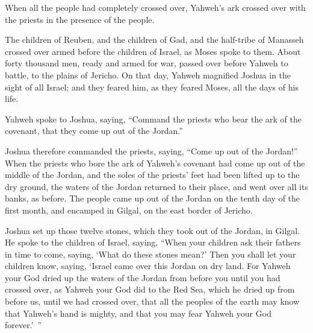 {When all the people had completely crossed over, Yahweh’s ark crossed over with the priests in the presence of the people.
\par }{\PP {}The children of Reuben, and the children of Gad, and the half-tribe of Manasseh crossed over armed before the children of Israel, as Moses spoke to them.
About forty thousand men, ready and armed for war, passed over before Yahweh to battle, to the plains of Jericho.
On that day, Yahweh magnified Joshua in the sight of all Israel; and they feared him, as they feared Moses, all the days of his life.
\par }{\PP {}Yahweh spoke to Joshua, saying,
“Command the priests who bear the ark of the covenant, that they come up out of the Jordan.”
\par }{\PP {}Joshua therefore commanded the priests, saying, “Come up out of the Jordan!”
When the priests who bore the ark of Yahweh’s covenant had come up out of the middle of the Jordan, and the soles of the priests’ feet had been lifted up to the dry ground, the waters of the Jordan returned to their place, and went over all its banks, as before.
The people came up out of the Jordan on the tenth day of the first month, and encamped in Gilgal, on the east border of Jericho.
\par }{\PP {}Joshua set up those twelve stones, which they took out of the Jordan, in Gilgal.
He spoke to the children of Israel, saying, “When your children ask their fathers in time to come, saying, ‘What do these stones mean?’
Then you shall let your children know, saying, ‘Israel came over this Jordan on dry land.
For Yahweh your God dried up the waters of the Jordan from before you until you had crossed over, as Yahweh your God did to the Red Sea, which he dried up from before us, until we had crossed over,
that all the peoples of the earth may know that Yahweh’s hand is mighty, and that you may fear Yahweh your God forever.’ ”

}
